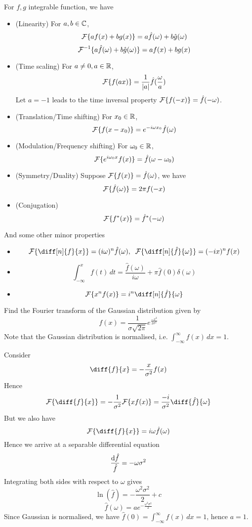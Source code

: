\documentclass[11pt]{article}
\begin{document}
\begin{proposition}
  For \(f,g\) integrable function, we have
  \begin{itemize}
    \item (Linearity) For \(a,b\in \C\), 
    \[\cal{F}\{af(x)+bg(x)\}=a\hat{f}(\omega)+b\hat{g}(\omega)\]
    \[\cal{F}^{-1}\{a\hat{f}(\omega)+b\hat{g}(\omega)\}=af(x)+bg(x)\]
    \item (Time scaling) For \(a\neq 0,a\in\R\),
    \[\cal{F}\{f(ax)\}=\frac{1}{|a|}\hat{f}(\frac{\omega}{a})\]
    Let \(a=-1\) leads to the time inversal property \(\cal{F}\{f(-x)\}=\hat{f}(-\omega)\).
    \item (Translation/Time shifting) For \(x_0\in\R\),
    \[\cal{F}\{f(x-x_0)\}=e^{-i\omega x_0}\hat{f}(\omega)\]
    \item (Modulation/Frequency shifting) For \(\omega_0\in\R\),
    \[\cal{F}\{e^{i\omega_0x}f(x)\}=\hat{f}(\omega-\omega_0)\]
    \item (Symmetry/Duality) Suppose \(\cal{F}\{f(x)\}=\hat{f}(\omega)\), we have 
    \[\cal{F}\{\hat{f}(\omega)\}=2\pi f(-x)\]
    \item (Conjugation)
    \[\cal{F}\{f^*(x)\}=\hat{f}^*(-\omega)\]
  \end{itemize}
  And some other minor properties
  \begin{itemize}
    \item \[\cal{F}\{\diff[n]{f}{x}\}=(i\omega)^n\hat{f}(\omega), \;\; \cal{F}\{\diff[n]{\hat{f}}{\omega}\}=(-ix)^nf(x)\]
    \item \[\int_{-\infty}^{x}f(t)\,dt=\frac{\hat{f}(\omega)}{i\omega}+\pi\hat{f}(0)\delta(\omega)\]
    \item \[\cal{F}\{x^nf(x)\}=i^n\diff[n]{\hat{f}}{\omega}\]
  \end{itemize}
\end{proposition}

\begin{problem}
  Find the Fourier transform of the Gaussian distribution given by \[f(x)=\frac{1}{\sigma\sqrt{2\pi}}e^{\frac{-x^2}{2\sigma^2}}\]
  Note that the Gaussian distribution is normalised, i.e. \(\int_{-\infty}^{\infty}f(x)\,dx=1\).
\end{problem}
\begin{solution}
  Consider 
  \[\diff{f}{x}=-\frac{x}{\sigma^2}f(x)\]
  Hence
  \[\cal{F}\{\diff{f}{x}\}=-\frac{1}{\sigma^2}\cal{F}\{xf(x)\}=\frac{-i}{\sigma^2}\diff{\hat{f}}{\omega}\]
  But we also have 
  \[\cal{F}\{\diff{f}{x}\}=i\omega\hat{f}(\omega)\]
  Hence we arrive at a separable differential equation
  \[\frac{\rm{d}\hat{f}}{\hat{f}}=-\omega\sigma^2\]
  Integrating both sides with respect to \(\omega\) gives
  \[\ln(\hat{f})=-\frac{\omega^2\sigma^2}{2}+c\]
  \[\hat{f}(\omega)=ae^{-\frac{\omega^2\sigma^2}{2}}\]
  Since Gaussian is normalised, we have \(\hat{f}(0)=\int_{-\infty}^{\infty}f(x)\,dx=1\), hence \(a=1\).
\end{solution}
\end{document}
